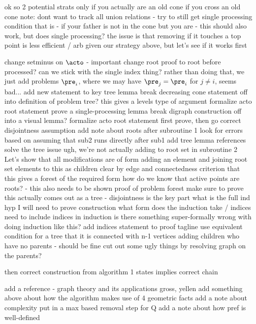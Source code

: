 ok so 2 potential strats
    only if you actually are an old cone 
    if you cross an old cone 
        note: dont want to track all union relations - try to still get single processing condition
        that is - if your father is not in the cone but you are - this should also work, but does single processing? 
        the issue is that removing if it touches a top point is less efficient / arb given our strategy above, but let's see if it works first 

change setminus on $\acto$ - important 
change root proof to root before processed? 
can we stick with the single index thing? 
rather than doing that, we just add problems $\pre_i$, where we may have $\pre_j = \pre_i$ for $j \not = i$, seems bad...
add new statement to key tree lemma
break decreasing cone statement off into definition of problem tree? 
this gives a levels type of argument 
formalize acto root statement
prove a single-processing lemma 
break digraph construction off into a visual lemma? 
formalize acto root statement 
first prove, then go correct disjointness assumption
add note about roots after subroutine 1 
look for errors based on assuming that sub2 runs directly after sub1
add tree lemma references
solve the tree issue
ugh, we're not actually adding to root set in subroutine 2 
Let's show that all modifications are of form
    adding an element and joining root set elements to this as children 
    clear by edge and connectedness criterion that this gives a forest of the required form 
how do we know that active points are roots? - this also needs to be shown
proof of problem forest
make sure to prove this actually comes out as a tree - disjointness is the key part
what is the full ind hyp I will need to prove construction 
what form does the induction take / indices
need to include indices in induction
is there something super-formally wrong with doing induction like this? 
add indices statement to proof tagline
use equivalent condition for a tree that it is connected with n-1 vertices
adding children who have no parents - should be fine 
cut out some ugly things by resolving graph on the parents? 

then correct construction from algorithm 1 states implies correct chain 

add a reference - graph theory and its applications gross, yellen
add something above about how the algorithm makes use of 4 geometric facts 
add a note about complexity 
put in a max based removal step for Q
add a note about how pref is well-defined 


